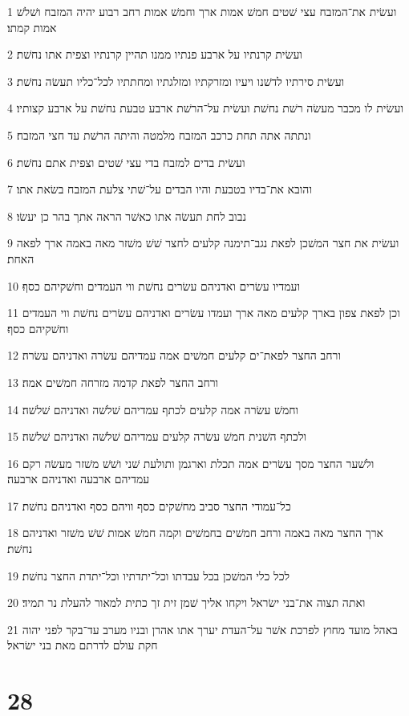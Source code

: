 \par 1 ועשׂית את־המזבח עצי שׁטים חמשׁ אמות ארך וחמשׁ אמות רחב רבוע יהיה המזבח ושׁלשׁ אמות קמתו׃
\par 2 ועשׂית קרנתיו על ארבע פנתיו ממנו תהיין קרנתיו וצפית אתו נחשׁת׃
\par 3 ועשׂית סירתיו לדשׁנו ויעיו ומזרקתיו ומזלגתיו ומחתתיו לכל־כליו תעשׂה נחשׁת׃
\par 4 ועשׂית לו מכבר מעשׂה רשׁת נחשׁת ועשׂית על־הרשׁת ארבע טבעת נחשׁת על ארבע קצותיו׃
\par 5 ונתתה אתה תחת כרכב המזבח מלמטה והיתה הרשׁת עד חצי המזבח׃
\par 6 ועשׂית בדים למזבח בדי עצי שׁטים וצפית אתם נחשׁת׃
\par 7 והובא את־בדיו בטבעת והיו הבדים על־שׁתי צלעת המזבח בשׂאת אתו׃
\par 8 נבוב לחת תעשׂה אתו כאשׁר הראה אתך בהר כן יעשׂו׃
\par 9 ועשׂית את חצר המשׁכן לפאת נגב־תימנה קלעים לחצר שׁשׁ משׁזר מאה באמה ארך לפאה האחת׃
\par 10 ועמדיו עשׂרים ואדניהם עשׂרים נחשׁת ווי העמדים וחשׁקיהם כסף׃
\par 11 וכן לפאת צפון בארך קלעים מאה ארך ועמדו עשׂרים ואדניהם עשׂרים נחשׁת ווי העמדים וחשׁקיהם כסף׃
\par 12 ורחב החצר לפאת־ים קלעים חמשׁים אמה עמדיהם עשׂרה ואדניהם עשׂרה׃
\par 13 ורחב החצר לפאת קדמה מזרחה חמשׁים אמה׃
\par 14 וחמשׁ עשׂרה אמה קלעים לכתף עמדיהם שׁלשׁה ואדניהם שׁלשׁה׃
\par 15 ולכתף השׁנית חמשׁ עשׂרה קלעים עמדיהם שׁלשׁה ואדניהם שׁלשׁה׃
\par 16 ולשׁער החצר מסך עשׂרים אמה תכלת וארגמן ותולעת שׁני ושׁשׁ משׁזר מעשׂה רקם עמדיהם ארבעה ואדניהם ארבעה׃
\par 17 כל־עמודי החצר סביב מחשׁקים כסף וויהם כסף ואדניהם נחשׁת׃
\par 18 ארך החצר מאה באמה ורחב חמשׁים בחמשׁים וקמה חמשׁ אמות שׁשׁ משׁזר ואדניהם נחשׁת׃
\par 19 לכל כלי המשׁכן בכל עבדתו וכל־יתדתיו וכל־יתדת החצר נחשׁת׃
\par 20 ואתה תצוה את־בני ישׂראל ויקחו אליך שׁמן זית זך כתית למאור להעלת נר תמיד׃
\par 21 באהל מועד מחוץ לפרכת אשׁר על־העדת יערך אתו אהרן ובניו מערב עד־בקר לפני יהוה חקת עולם לדרתם מאת בני ישׂראל׃

\chapter{28}

